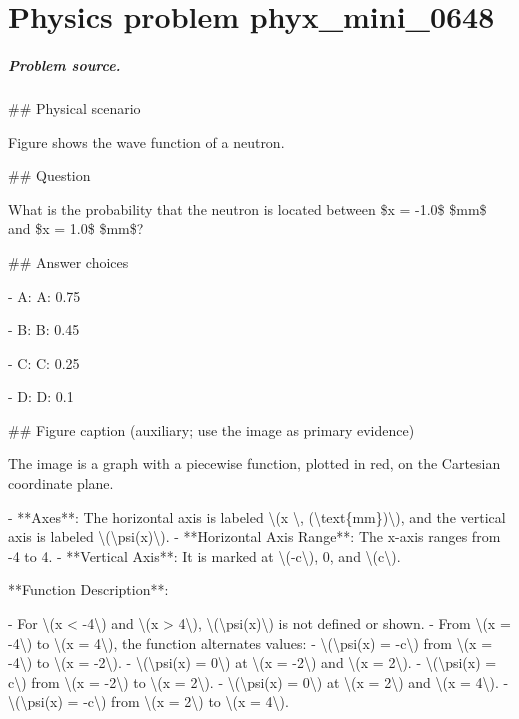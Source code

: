
\chapter{Physics problem phyx\_mini\_0648}
\label{ch:PhyXMiniProblems_problem_phyx_mini_0648}

\paragraph{Problem source.}
\#\# Physical scenario

Figure shows the wave function of a neutron.

\#\# Question

What is the probability that the neutron is located between \$x = -1.0\$ \$mm\$ and \$x = 1.0\$ \$mm\$?

\#\# Answer choices

- A: A: 0.75

- B: B: 0.45

- C: C: 0.25

- D: D: 0.1

\#\# Figure caption (auxiliary; use the image as primary evidence)

The image is a graph with a piecewise function, plotted in red, on the Cartesian coordinate plane. 

- **Axes**: The horizontal axis is labeled \textbackslash{}(x \textbackslash{}, (\textbackslash{}text\{mm\})\textbackslash{}), and the vertical axis is labeled \textbackslash{}(\textbackslash{}psi(x)\textbackslash{}).
- **Horizontal Axis Range**: The x-axis ranges from -4 to 4.
- **Vertical Axis**: It is marked at \textbackslash{}(-c\textbackslash{}), 0, and \textbackslash{}(c\textbackslash{}).

**Function Description**:

- For \textbackslash{}(x < -4\textbackslash{}) and \textbackslash{}(x > 4\textbackslash{}), \textbackslash{}(\textbackslash{}psi(x)\textbackslash{}) is not defined or shown.
- From \textbackslash{}(x = -4\textbackslash{}) to \textbackslash{}(x = 4\textbackslash{}), the function alternates values:
  - \textbackslash{}(\textbackslash{}psi(x) = -c\textbackslash{}) from \textbackslash{}(x = -4\textbackslash{}) to \textbackslash{}(x = -2\textbackslash{}).
  - \textbackslash{}(\textbackslash{}psi(x) = 0\textbackslash{}) at \textbackslash{}(x = -2\textbackslash{}) and \textbackslash{}(x = 2\textbackslash{}).
  - \textbackslash{}(\textbackslash{}psi(x) = c\textbackslash{}) from \textbackslash{}(x = -2\textbackslash{}) to \textbackslash{}(x = 2\textbackslash{}).
  - \textbackslash{}(\textbackslash{}psi(x) = 0\textbackslash{}) at \textbackslash{}(x = 2\textbackslash{}) and \textbackslash{}(x = 4\textbackslash{}).
  - \textbackslash{}(\textbackslash{}psi(x) = -c\textbackslash{}) from \textbackslash{}(x = 2\textbackslash{}) to \textbackslash{}(x = 4\textbackslash{}).

